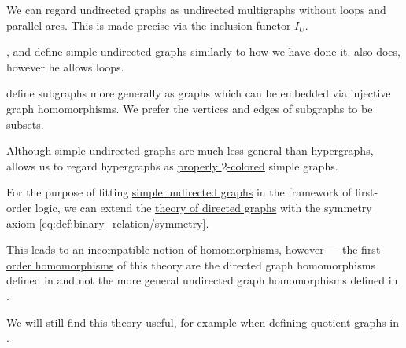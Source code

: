 \begin{comments}
  \item We can regard undirected graphs as undirected multigraphs without loops and parallel arcs. This is made precise via the inclusion functor \hyperref[def:graph_functors/undirected_inclusion]{\( I_U \)}.

  \item {},  and  define simple undirected graphs similarly to how we have done it.  also does, however he allows loops.

  \item {} define subgraphs more generally as graphs which can be embedded via injective graph homomorphisms. We prefer the vertices and edges of subgraphs to be subsets.

  \item Although simple undirected graphs are much less general than \hyperref[def:hypergraph]{hypergraphs},  allows us to regard hypergraphs as \hyperref[def:graph_coloring/proper]{properly \( 2 \)-colored} simple graphs.
\end{comments}

\begin{remark}\label{rem:theory_of_simple_undirected_graphs}
  For the purpose of fitting \hyperref[def:undirected_graph]{simple undirected graphs} in the framework of first-order logic, we can extend the \hyperref[def:directed_graph/theory]{theory of directed graphs} with the symmetry axiom \eqref{eq:def:binary_relation/symmetry}.

  This leads to an incompatible notion of homomorphisms, however --- the \hyperref[def:first_order_homomorphism]{first-order homomorphisms} of this theory are the directed graph homomorphisms defined in  and not the more general undirected graph homomorphisms defined in .

  We will still find this theory useful, for example when defining quotient graphs in .
\end{remark}


